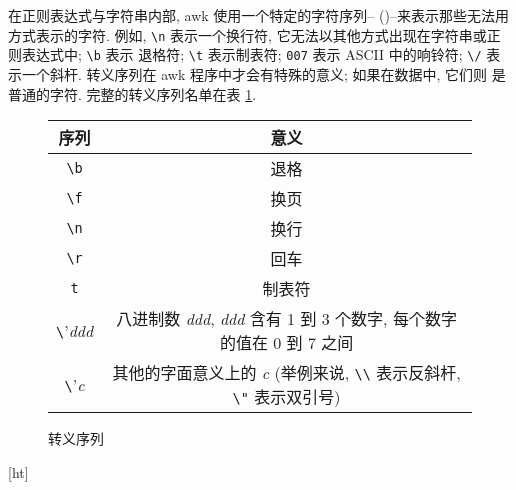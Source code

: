 在正则表达式与字符串内部, awk 使用一个特定的字符序列--
()--来表示那些无法用方式表示的字符. 例如, \verb'\n'
表示一个换行符, 它无法以其他方式出现在字符串或正则表达式中; \verb'\b' 表示
退格符; \verb'\t' 表示制表符; \verb'007' 表示 ASCII 中的响铃符; \verb'\/'
表示一个斜杆. 转义序列在 awk 程序中才会有特殊的意义; 如果在数据中, 它们则
是普通的字符. 完整的转义序列名单在表 \ref{tbl:escape_sequences}.
\begin{figure}[ht]
\caption{转义序列}
\label{tbl:escape_sequences}
\begin{tabular}{c|c}
    \hline
    \hline
    序列        & 意义 \\
    \hline
    \verb'\b'   & 退格  \\
    \verb'\f'   & 换页  \\
    \verb'\n'   & 换行  \\
    \verb'\r'   & 回车  \\
    \verb't'    & 制表符    \\
    \verb'\'\textit{ddd} & 八进制数 \textit{ddd}, \textit{ddd} 含有 1 到 3
        个数字, 每个数字的值在 0 到 7 之间 \\
    \verb'\'\textit{c} & 其他的字面意义上的 \textit{c} (举例来说, \verb'\\'
        表示反斜杆, \verb'\"' 表示双引号) \\
    \hline
\end{tabular}
\end{figure}[ht]

